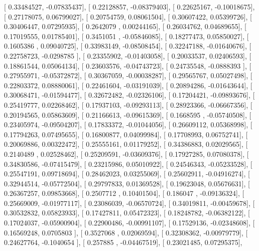 \documentclass{article}
\begin{document}
       [ 0.33484527, -0.07835437],
       [ 0.22128857, -0.08379403],
       [ 0.22625167, -0.10018675],
       [ 0.27178075,  0.06799027],
       [ 0.20754759,  0.08061504],
       [ 0.30607422,  0.05399726],
       [ 0.30406447,  0.07295935],
       [ 0.2642079 ,  0.00244165],
       [ 0.26034762,  0.04689655],
       [ 0.17019555,  0.01785401],
       [ 0.3451051 , -0.05846085],
       [ 0.18277473,  0.05850027],
       [ 0.1605386 ,  0.09040725],
       [ 0.33983149, -0.08508454],
       [ 0.32247188, -0.01640676],
       [ 0.22758723, -0.0298785 ],
       [ 0.23355902, -0.01403058],
       [ 0.20033537,  0.02406593],
       [ 0.18861544,  0.05064134],
       [ 0.23603576, -0.04743723],
       [ 0.24735548, -0.0888393 ],
       [ 0.27955971, -0.05372872],
       [ 0.30367059, -0.00038287],
       [ 0.29565767,  0.05027498],
       [ 0.22803372,  0.08880061],
       [ 0.22461604, -0.03191039],
       [ 0.20894286, -0.01643644],
       [ 0.30068471, -0.01594477],
       [ 0.32672482, -0.02326106],
       [ 0.17204421, -0.09893676],
       [ 0.25419777,  0.02268462],
       [ 0.17937103, -0.09293113],
       [ 0.28923366, -0.06667356],
       [ 0.20194565,  0.05863609],
       [ 0.21166613, -0.09615369],
       [ 0.1668595 , -0.05740508],
       [ 0.23405974, -0.09504207],
       [ 0.17833372, -0.01044056],
       [ 0.26609112,  0.05368998],
       [ 0.17794263,  0.07495655],
       [ 0.16800877,  0.04099984],
       [ 0.17708993,  0.06752741],
       [ 0.20069886,  0.00322472],
       [ 0.25555161,  0.01179252],
       [ 0.34386883,  0.02029565],
       [ 0.2140489 ,  0.02528462],
       [ 0.25209591, -0.03609376],
       [ 0.17927285,  0.07080378],
       [ 0.34830586, -0.07415479],
       [ 0.23215986,  0.05010922],
       [ 0.24546343, -0.05233528],
       [ 0.25547191,  0.09718694],
       [ 0.28462023,  0.03255069],
       [ 0.25602911, -0.04916274],
       [ 0.32944514, -0.05772504],
       [ 0.29797833,  0.01369528],
       [ 0.19623048,  0.05676631],
       [ 0.26367257,  0.09853668],
       [ 0.2507712 ,  0.10401504],
       [ 0.186047  , -0.09136324],
       [ 0.25669009, -0.01977117],
       [ 0.23086039, -0.06570724],
       [ 0.34019811, -0.00459678],
       [ 0.30532832,  0.05823933],
       [ 0.17427811,  0.05472323],
       [ 0.18248782, -0.06382122],
       [ 0.17024037, -0.05900904],
       [ 0.22900486, -0.00991107],
       [ 0.17529136, -0.02348608],
       [ 0.16569248,  0.0705803 ],
       [ 0.3527068 ,  0.02069594],
       [ 0.32308362, -0.00979779],
       [ 0.24627764, -0.1040654 ],
       [ 0.257885  , -0.04467519],
       [ 0.23021485,  0.07295375],
\end{document}
